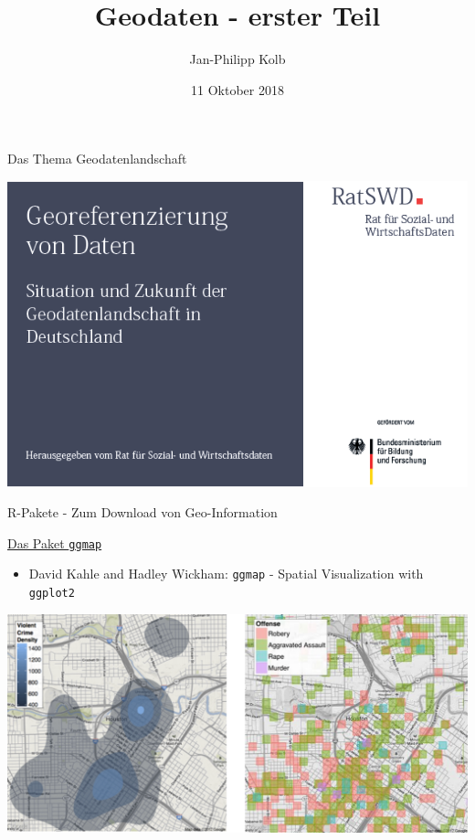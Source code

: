 \documentclass[ignorenonframetext,]{beamer}
\title{Geodaten - erster Teil}
\author{Jan-Philipp Kolb}
\date{11 Oktober 2018}
\providecommand{\tightlist}{%
  \setlength{\itemsep}{0pt}\setlength{\parskip}{0pt}}
\begin{document}
\frame{\titlepage}

\begin{frame}{Das Thema Geodatenlandschaft}

\includegraphics{figure/BildRatSWDBericht.png}

\end{frame}

\begin{frame}[fragile]{R-Pakete - Zum Download von Geo-Information}

\begin{block}{\href{https://sites.google.com/site/davidkahle/ggmap}{Das
Paket \texttt{ggmap}}}

\begin{itemize}
\tightlist
\item
  David Kahle and Hadley Wickham: \texttt{ggmap} - Spatial Visualization
  with \texttt{ggplot2}
\end{itemize}

\includegraphics{figure/Rgeopackages.PNG}

\end{block}

\end{frame}
\end{document}
